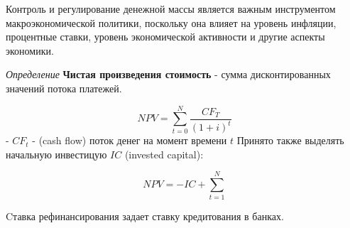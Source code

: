 Контроль и регулирование денежной массы является важным инструментом макроэкономической политики, поскольку она влияет на уровень инфляции, процентные ставки, уровень экономической активности и другие аспекты экономики.

\textit{Определение} \textbf{Чистая произведения стоимость} - сумма дисконтированных значений потока платежей.

$$
    NPV = \sum_{t=0}^N \frac{CF_T}{(1+i)^t}
$$
- $CF_t$  - (cash flow) поток денег на момент времени $t$  
Принято также выделять начальную инвестицую $IC$ (invested capital):

$$
    NPV = -IC + \sum_{t=1}^N 
$$

Cтавка рефинансирования задает ставку кредитования в банках. 
